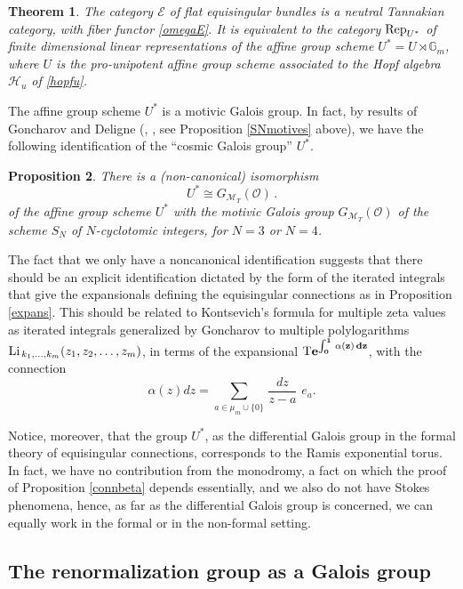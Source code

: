 \documentclass[10pt]{amsart}
\newcommand{\bG}{\mathbb{G}}
\def\Ec{{\mathcal E}}
\def\Hc{{\mathcal H}}
\def\cM{{\mathcal M}}
\newcommand{\fO}{{\mathcal{O}}}
\def\a{\alpha}
\newtheorem{thm}{Theorem}[section]
\newtheorem{prop}[thm]{Proposition}
\numberwithin{equation}{section}
\begin{document}
\begin{thm}\label{EU}
The category $\Ec$ of flat equisingular bundles
is a neutral Tannakian category, with fiber
functor \eqref{omegaE}. It is equivalent to the category ${\rm
Rep}_{U^*}$ of finite dimensional linear representations of the
affine group scheme $U^*=U\rtimes \bG_m$, where $U$ is the
pro-unipotent affine group scheme associated to the Hopf algebra
$\Hc_u$ of \eqref{hopfu}.
\end{thm}

The affine group scheme $U^*$ is a motivic Galois group. In fact,
by results of Goncharov and Deligne (\cite{dg}, \cite{Gon}, see
Proposition \ref{SNmotives} above), we have the following
identification of the ``cosmic Galois group'' $U^*$.

\begin{prop} \label{motgal} There is a
(non-canonical)  isomorphism
\begin{equation}\label{MotU}
U^* \cong G_{\cM_T}(\fO) \,.
\end{equation}
of the affine group scheme $U^*$ with the motivic Galois group
$G_{\cM_T}(\fO)$ of  the scheme $S_N$ of $N$-cyclotomic integers,
for $N=3$ or $N=4$.
\end{prop}

The fact that we only have a noncanonical identification suggests
that there should be an explicit identification dictated by the
form of the iterated integrals that give the expansionals defining
the equisingular connections as in Proposition \ref{expans}. This
should be related to Kontsevich's formula for multiple zeta values
as iterated integrals generalized by Goncharov to multiple
polylogarithms ${\rm Li}_{\,k_1,\ldots,k_m}(z_1,z_2,\ldots,z_m)$,
in terms of the expansional ${\bf {\rm
T}e^{\int_0^1\,\a(z)\,dz}}$, with the connection
$$ \alpha(z)dz = \sum_{a\in  \mu_m\cup \{0\}} \, \frac{dz}{z-a} \,\, e_a. $$

Notice, moreover, that the group $U^*$, as the differential Galois
group in the formal theory of equisingular connections,
corresponds to the Ramis exponential torus. In fact, we have no
contribution from the monodromy, a fact on which the proof of
Proposition \ref{connbeta} depends essentially, and we also do not
have Stokes phenomena, hence, as far as the differential Galois
group is concerned, we can equally work in the formal or in the
non-formal setting.


\medskip
\subsection*{The renormalization group as a Galois group}\hfill\medskip
\end{document}
